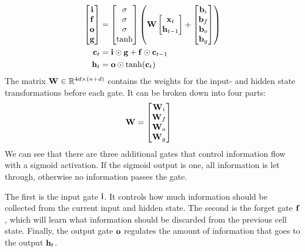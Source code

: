 		\begin{align}\label{eq:Vanilla-LSTM-Definition}
			\begin{split}
				\begin{bmatrix}
					\mathbf{i} \\ 
					\mathbf{f} \\ 
					\mathbf{o} \\ 
					\mathbf{g}
				\end{bmatrix}
				&=
				\begin{bmatrix}
					\sigma \\ 
					\sigma \\ 
					\sigma \\ 
					\tanh
				\end{bmatrix}
				\left(
				\mathbf{W}
				\begin{bmatrix}
					\mathbf{x}_t \\
					\mathbf{h}_{t-1}
				\end{bmatrix}
				+
				\begin{bmatrix}
					\mathbf{b}_i \\ 
					\mathbf{b}_f \\ 
					\mathbf{b}_o \\ 
					\mathbf{b}_g
				\end{bmatrix}
				\right)
				\\
				\mathbf{c}_t &= \mathbf{i} \odot \mathbf{g} + \mathbf{f} \odot \mathbf{c}_{t-1} \\
				\mathbf{h}_t &= \mathbf{o} \odot \tanh(\mathbf{c}_{t})
			\end{split}
		\end{align}
		The matrix $\mathbf{W} \in \mathbb{R}^{4d \times (n + d)}$ contains the weights for the input- and hidden state transformations before each gate.
		It can be broken down into four parts:
		\begin{align}
			\mathbf{W} &=
			\begin{bmatrix}
				\mathbf{W}_i \\ 
				\mathbf{W}_f \\ 
				\mathbf{W}_o \\ 
				\mathbf{W}_g
			\end{bmatrix}
		\end{align}
		We can see that there are three additional gates that control information flow with a sigmoid activation.
		If the sigmoid output is one, all information is let through, otherwise no information passes the gate. 
		
		The first is the input gate $\mathbf{i}$.
		It controls how much information should be collected from the current input and hidden state.
		The second is the forget gate $\mathbf{f}$, which will learn what information should be discarded from the previous cell state.
		Finally, the output gate $\mathbf{o}$ regulates the amount of information that goes to the output $\mathbf{h}_t$.
	
